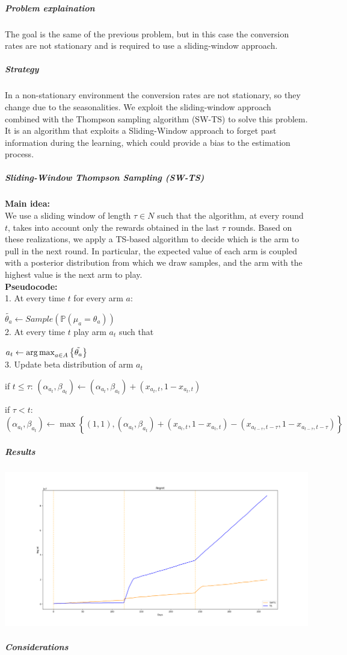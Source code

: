 \subparagraph*{Problem explaination}
The goal is the same of the previous problem, but in this case the conversion rates are not stationary and is required to use a sliding-window approach.
\subparagraph*{Strategy}
In a non-stationary environment the conversion rates are not stationary, so they change due to the seasonalities.
We exploit the sliding-window approach combined with the Thompson sampling algorithm (SW-TS) to solve this problem. It is an algorithm that exploits a Sliding-Window approach to forget past information  during the learning, which could provide a bias to the estimation process.
\subparagraph*{Sliding-Window Thompson Sampling (SW-TS)} 

\textbf{Main idea:}\\
We use a sliding window of length $\tau\in N$ such that the algorithm, at every round $t$, takes into account only the rewards obtained in the last $\tau$ rounds. Based on these realizations, we apply a TS-based algorithm to decide which is the arm to pull in the next round. In particular, the expected value of each arm is coupled with a posterior distribution from which we draw samples, and the arm with the highest value is the next arm to play.\\

\textbf{Pseudocode:}\\

1. At every time $t$ for every arm $a$:

$\tilde{\theta_{a}} \leftarrow Sample(\mathbb P(\mu_{a}=\theta_{a}))$ \\

2. At every time $t$ play arm $a_{t}$ such that 

$a_{t} \leftarrow \operatorname{arg\,max}_{a \in A} \left\{ \tilde{\theta_{a}}  \right\} $ \\

3.  Update beta distribution of arm $a_{t}$

if $t\leq\tau$: $(\alpha_{a_{t}}, \beta_{a_{t}}) \leftarrow (\alpha_{a_{t}}, \beta_{a_{t}}) + (x_{a_{t},t}, 1 - x_{a_{t},t})$ 

if $\tau<t$:	$(\alpha_{a_{t}}, \beta_{a_{t}}) \leftarrow \max \left\{(1,1), (\alpha_{a_{t}}, \beta_{a_{t}}) + (x_{a_{t},t}, 1 - x_{a_{t},t}) - (x_{a_{t-\tau},t-\tau}, 1 - x_{a_{t-\tau},t-\tau})    \right\}$
\subparagraph*{Results}
\begin{center}
	\includegraphics[scale=0.30]{Images/n7}
\end{center}
\subparagraph*{Considerations}